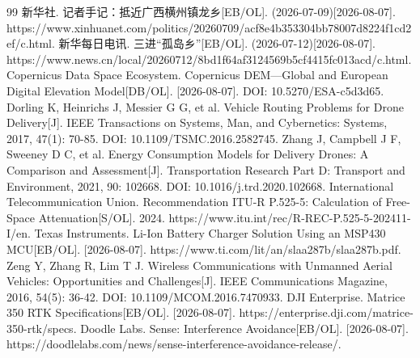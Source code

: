 \documentclass[bwprint]{gmcmthesis}
\begin{document}
\pagestyle{plain}












\begin{thebibliography}{99}
 新华社. 记者手记：抵近广西横州镇龙乡[EB/OL]. (2026-07-09)[2026-08-07]. https://www.xinhuanet.com/politics/20260709/acf8e4b353304bb78007d8224f1cd2ef/c.html.
 新华每日电讯. 三进“孤岛乡”[EB/OL]. (2026-07-12)[2026-08-07]. https://www.news.cn/local/20260712/8bd1f64af3124569b5cf4415fc013acd/c.html.
 Copernicus Data Space Ecosystem. Copernicus DEM—Global and European Digital Elevation Model[DB/OL]. [2026-08-07]. DOI: 10.5270/ESA-c5d3d65.
 Dorling K, Heinrichs J, Messier G G, et al. Vehicle Routing Problems for Drone Delivery[J]. IEEE Transactions on Systems, Man, and Cybernetics: Systems, 2017, 47(1): 70-85. DOI: 10.1109/TSMC.2016.2582745.
 Zhang J, Campbell J F, Sweeney D C, et al. Energy Consumption Models for Delivery Drones: A Comparison and Assessment[J]. Transportation Research Part D: Transport and Environment, 2021, 90: 102668. DOI: 10.1016/j.trd.2020.102668.
 International Telecommunication Union. Recommendation ITU-R P.525-5: Calculation of Free-Space Attenuation[S/OL]. 2024. https://www.itu.int/rec/R-REC-P.525-5-202411-I/en.
 Texas Instruments. Li-Ion Battery Charger Solution Using an MSP430 MCU[EB/OL]. [2026-08-07]. https://www.ti.com/lit/an/slaa287b/slaa287b.pdf.
 Zeng Y, Zhang R, Lim T J. Wireless Communications with Unmanned Aerial Vehicles: Opportunities and Challenges[J]. IEEE Communications Magazine, 2016, 54(5): 36-42. DOI: 10.1109/MCOM.2016.7470933.
 DJI Enterprise. Matrice 350 RTK Specifications[EB/OL]. [2026-08-07]. https://enterprise.dji.com/matrice-350-rtk/specs.
 Doodle Labs. Sense: Interference Avoidance[EB/OL]. [2026-08-07]. https://doodlelabs.com/news/sense-interference-avoidance-release/.
\end{thebibliography}

\begin{appendices}

\end{appendices}


\end{document}
